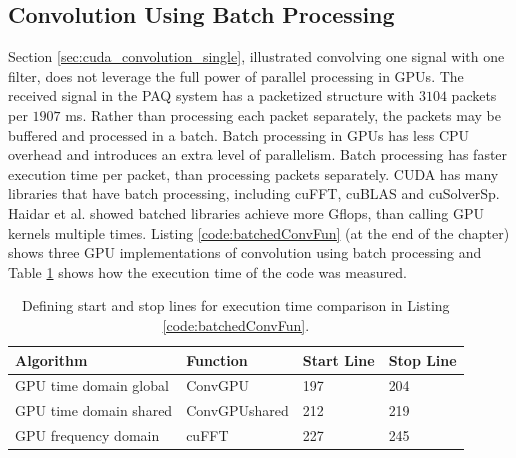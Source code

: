 \subsection{Convolution Using Batch Processing}
\label{sec:batched_convolution}
Section \ref{sec:cuda_convolution_single}, illustrated convolving one signal with one filter, does not leverage the full power of parallel processing in GPUs.
The received signal in the PAQ system has a packetized structure with $3104$ packets per $1907$ ms.
Rather than processing each packet separately, the packets may be buffered and processed in a batch.
Batch processing in GPUs has less CPU overhead and introduces an extra level of parallelism.
Batch processing has faster execution time per packet, than processing packets separately.
CUDA has many libraries that have batch processing, including cuFFT, cuBLAS and cuSolverSp.
Haidar et al. \cite{haidar2015optimization} showed batched libraries achieve more Gflops, than calling GPU kernels multiple times.
Listing \ref{code:batchedConvFun} (at the end of the chapter) shows three GPU implementations of convolution using batch processing and Table \ref{tab:BatchedGPUtimingTable} shows how the execution time of the code was measured.
\begin{table}
\captionsetup{width=6in}
\caption{Defining start and stop lines for execution time comparison in Listing \ref{code:batchedConvFun}.}
\begin{center}
\begin{tabular}{llll}
	\toprule
	Algorithm 				& Function		& Start Line	& Stop  Line		\\ \midrule
	GPU time domain global 	& ConvGPU 		& 197			& 204				\\
	GPU time domain shared 	& ConvGPUshared & 212			& 219				\\
	GPU frequency domain 	& cuFFT			& 227			& 245				\\ 
	\bottomrule
\end{tabular}
\end{center}
\label{tab:BatchedGPUtimingTable}
\end{table}

